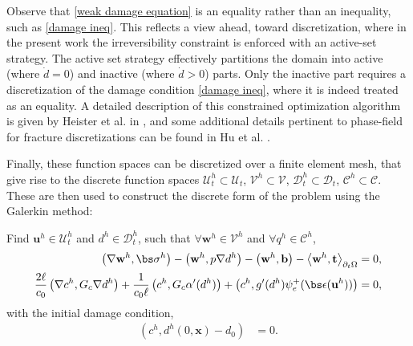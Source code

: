 Observe that \eqref{weak damage equation} is an equality rather than an inequality, such as \eqref{damage ineq}.  This reflects a view ahead, toward discretization, where in the present work  the irreversibility constraint is enforced with an active-set strategy.  The active set strategy effectively partitions the domain into active (where $\dot{d}=0$) and inactive (where $\dot{d}>0$) parts. Only the inactive part requires a discretization of the damage condition \eqref{damage ineq}, where it is indeed treated as an equality. A detailed description of this constrained optimization algorithm is given by Heister et al. in \cite{heister2015primal}, and some additional details pertinent to phase-field for fracture discretizations can be found in Hu et al. \cite{hu2020phase}.

Finally, these function spaces can be discretized over a finite element mesh, that give rise to the discrete function spaces $\boldsymbol{\mathcal{U}}^h_t \subset \boldsymbol{\mathcal{U}}_t$, $\boldsymbol{\mathcal{V}}^h \subset \boldsymbol{\mathcal{V}}$, $\mathcal{D}^h_t \subset \mathcal{D}_t$, $\mathcal{C}^h \subset \mathcal{C}$. These are then used to construct the discrete form of the problem using the Galerkin method:

\begin{mdframed}[
    frametitle={Spatially discretized form},
    frametitlebackgroundcolor=gray!20,
    backgroundcolor=gray!5,
    linewidth=0pt,
    nobreak=true
  ]
  Find $\textbf{u}^h \in \boldsymbol{\mathcal{U}}^h_t$ and $d^h \in \mathcal{D}^h_t$, such that $\forall \textbf{w}^h \in \boldsymbol{\mathcal{V}}^h$ and $\forall q^h \in \mathcal{C}^h$,
  \begin{subequations}
    \begin{align}
      \left( \nabla \textbf{w}^h, \bs\sigma^h \right) - \left( \textbf{w}^h, p\nabla d^h \right) - \left( \textbf{w}^h, \textbf{b} \right) - \left< \textbf{w}^h, \textbf{t} \right>_{\partial_t\Omega} & = 0, \label{eq: semidiscrete momentum balance}   \\
      \frac{2\ell}{c_0}\left( \nabla c^h, G_c\nabla d^h \right) + \frac{1}{c_0\ell}\left( c^h, G_c\alpha'(d^h) \right) + \left( c^h, g'(d^h)\psi_e^+ (\bs\epsilon(\textbf{u}^h)) \right) & = 0, \label{eq: semidiscrete fracture evolution}
    \end{align}
  \end{subequations}
  with the initial damage condition,
  \begin{subequations}
    \begin{align}
      \left( c^h, d^h(0,\textbf{x}) - d_0 \right)                & = 0.
    \end{align}
  \end{subequations}
\end{mdframed}

